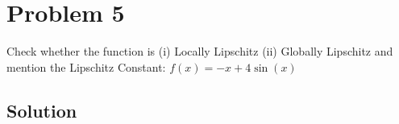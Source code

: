 \section*{Problem 5}

Check whether the function is
(i) Locally Lipschitz
(ii) Globally Lipschitz
and mention the Lipschitz Constant:
\( f (x) = -x + 4\sin(x) \)

\subsection*{Solution}
